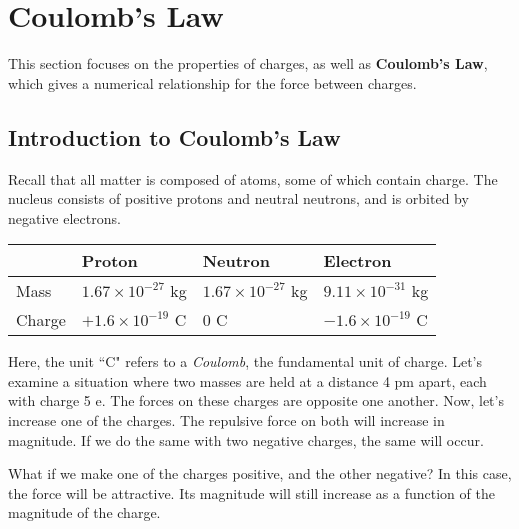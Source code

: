 \documentclass[11pt]{article}
\begin{document}
\section{Coulomb's Law}
This section focuses on the properties of charges, as well as \textbf{Coulomb's Law}, which gives a numerical relationship for the force between charges.
\subsection{Introduction to Coulomb's Law}
Recall that all matter is composed of atoms, some of which contain charge. The nucleus consists of positive protons and neutral neutrons, and is orbited by negative electrons.
\begin{table}[H]
	\centering
	\begin{tabular}{@{}llll@{}}\toprule
		& Proton & Neutron & Electron \\ \midrule
		Mass & $1.67 \times 10^{-27}$ kg & $1.67 \times 10^{-27}$ kg & $9.11 \times 10^{-31}$ kg  \\
		Charge & $+1.6 \times 10^{-19}$ C & 0 C & $-1.6 \times 10^{-19}$ C \\ \bottomrule
	\end{tabular}	
\end{table}

\noindent Here, the unit ``C" refers to a \textit{Coulomb}, the fundamental unit of charge. Let's examine a situation where two masses are held at a distance 4 pm apart, each with charge 5 e. The forces on these charges are opposite one another. Now, let's increase one of the charges. The repulsive force on both will increase in magnitude. If we do the same with two negative charges, the same will occur.

What if we make one of the charges positive, and the other negative? In this case, the force will be attractive. Its magnitude will still increase as a function of the magnitude of the charge.
\end{document}
